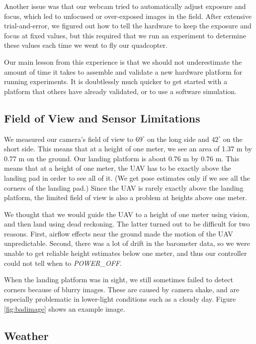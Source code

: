 \documentclass[10pt]{scrartcl} %
\begin{document}
Another issue was that our webcam tried to automatically adjust exposure and
focus, which led to unfocused or over-exposed images in the field. After
extensive trial-and-error, we figured out how to tell the hardware to keep the
exposure and focus at fixed values, but this required that we run an experiment
to determine these values each time we went to fly our quadcopter.

Our main lesson from this experience is that we should not underestimate the
amount of time it takes to assemble and validate a new hardware platform for
running experiments. It is doubtlessly much quicker to get started with a
platform that others have already validated, or to use a software simulation.

\subsection{Field of View and Sensor Limitations}

We measured our camera's field of view to $69^\circ$ on the long side and
$42^\circ$ on the short side. This means that at a height of one meter, we see
an area of 1.37 m by 0.77 m on the ground. Our landing platform is about 0.76 m
by 0.76 m. This means that at a height of one meter, the UAV has to be exactly
above the landing pad in order to see all of it. (We get pose estimates only if
we see all the corners of the landing pad.) Since the UAV is rarely exactly
above the landing platform, the limited field of view is also a problem at
heights above one meter.

We thought that we would guide the UAV to a height of one meter using vision,
and then land using dead reckoning. The latter turned out to be difficult for
two reasons. First, airflow effects near the ground made the motion of the UAV
unpredictable. Second, there was a lot of drift in the barometer data, so we
were unable to get reliable height estimates below one meter, and thus our
controller could not tell when to \textit{POWER\_OFF}.

When the landing platform was in sight, we still sometimes failed to detect
corners because of blurry images. These are caused by camera shake, and are
especially problematic in lower-light conditions such as a cloudy day. Figure
\ref{fig:badimage} shows an example image.

\subsection{Weather}
\end{document}
